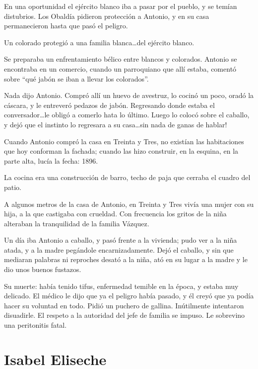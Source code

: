\documentclass[a4paper]{article}
\begin{document}
En una oportunidad el ejército blanco iba a pasar por el pueblo, y se temían distubrios. Los Obaldía pidieron protección a Antonio, y en su casa permanecieron hasta que pasó el peligro.


Un colorado protegió a una familia blanca\ldots del ejército blanco.

\bigbreak{}

Se preparaba un enfrentamiento bélico entre blancos y colorados. Antonio se encontraba en un comercio, cuando un parroquiano que allí estaba, comentó sobre ``qué jabón se iban a llevar los colorados''.

Nada dijo Antonio. Compró allí un huevo de avestruz, lo cocinó un poco, oradó la cáscara, y le entreveró pedazos de jabón. Regresando donde estaba el conversador\ldots le obligó a comerlo hata lo último. Luego lo colocó sobre el caballo, y dejó que el instinto lo regresara a su casa\ldots sin nada de ganas de hablar!

\bigbreak{}

Cuando Antonio compró la casa en Treinta y Tres, no existían las habitaciones que hoy conforman la fachada; cuando las hizo construir, en la esquina, en la parte alta, lucía la fecha: 1896.

La cocina era una construcción de barro, techo de paja que cerraba el cuadro del patio.

\bigbreak{}

A algunos metros de la casa de Antonio, en Treinta y Tres vivía una mujer con su hija, a la que castigaba con crueldad. Con frecuencia los gritos de la niña alteraban la tranquilidad de la familia Vázquez.

Un día iba Antonio a caballo, y pasó frente a la vivienda; pudo ver a la niña atada, y a la madre pegándole encarnizadamente. Dejó el caballo, y sin que mediaran palabras ni reproches desató a la niña, ató en su lugar a la madre y le dio unos buenos fustazos.

\bigbreak{}

Su muerte: había tenido tifus, enfermedad temible en la época, y estaba muy delicado. El médico le dijo que ya el peligro había pasado, y él creyó que ya podía hacer su voluntad en todo. Pidió un puchero de gallina. Inútilmente intentaron disuadirle. El respeto a la autoridad del jefe de familia se impuso. Le sobrevino una peritonitis fatal.

\section{Isabel Eliseche}
\end{document}
